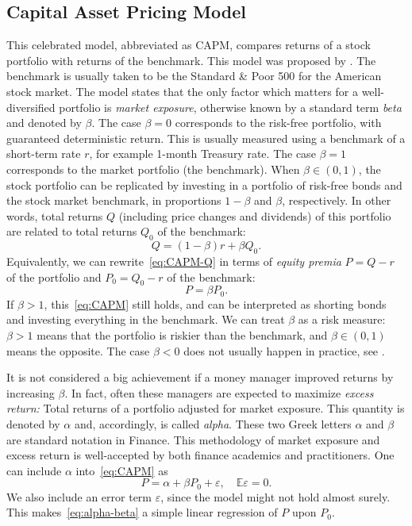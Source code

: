 \documentclass[12pt]{amsart}
\begin{document}
\subsection{Capital Asset Pricing Model} This celebrated model, abbreviated as CAPM, compares returns of a stock portfolio with returns of the benchmark. This model was proposed by \cite{Lintner, Mossin, Sharpe}. The benchmark is usually taken to be the Standard \& Poor 500 for the American stock market. The model states that the only factor which matters for a well-diversified portfolio is {\it market exposure}, otherwise known by a standard term {\it beta} and denoted by $\beta$. The case $\beta = 0$ corresponds to the risk-free portfolio, with guaranteed deterministic return. This is usually measured using a benchmark of a short-term rate $r$, for example 1-month Treasury rate. The case $\beta = 1$ corresponds to the market portfolio (the benchmark). When $\beta \in (0, 1)$, the stock portfolio can be replicated by investing in a portfolio of risk-free bonds and the stock market benchmark, in proportions $1 - \beta$ and $\beta$, respectively. In other words, total returns $Q$ (including price changes and dividends) of this portfolio are related to total returns $Q_0$ of the benchmark:
\begin{equation}
\label{eq:CAPM-Q}
Q = (1-\beta)r + \beta Q_0.
\end{equation}
Equivalently, we can rewrite~\eqref{eq:CAPM-Q} in terms of {\it equity premia} $P = Q - r$ of the portfolio and $P_0 = Q_0 - r$ of the benchmark: 
\begin{equation}
\label{eq:CAPM}
P = \beta P_0.
\end{equation}
If $\beta > 1$, this~\eqref{eq:CAPM} still holds, and can be interpreted as shorting bonds and investing everything in the benchmark. We can treat $\beta$ as a risk measure: $\beta > 1$ means that the portfolio is riskier than the benchmark, and $\beta \in (0, 1)$ means the opposite. The case $\beta < 0$ does not usually happen in practice, see \cite[Chapter 7]{Ang}.

It is not considered a big achievement if a money manager improved returns by increasing $\beta$. In fact, often these managers are expected to maximize {\it excess return:} Total returns of a portfolio adjusted for market exposure. This quantity is denoted by $\alpha$ and, accordingly, is called {\it alpha}. These two Greek letters $\alpha$ and $\beta$ are standard notation in Finance. This methodology of market exposure and excess return is well-accepted by both finance academics and practitioners. One can include $\alpha$ into~\eqref{eq:CAPM} as
\begin{equation}
\label{eq:alpha-beta}
P = \alpha + \beta P_0 + \varepsilon,\quad \mathbb E\varepsilon = 0.
\end{equation}
We also include an error term $\varepsilon$, since the model might not hold almost surely. This makes~\eqref{eq:alpha-beta} a simple linear regression of $P$ upon $P_0$. 
\end{document}
